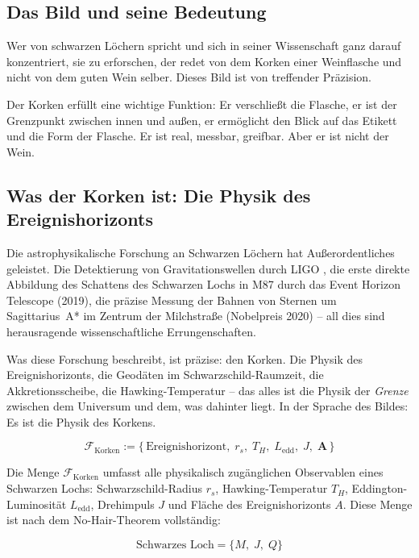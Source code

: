 ﻿\documentclass[12pt,a4paper]{report}
\begin{document}
\subsection{Das Bild und seine Bedeutung}

Wer von schwarzen Löchern spricht und sich in seiner Wissenschaft ganz darauf konzentriert, sie zu erforschen, der redet von dem Korken einer Weinflasche und nicht von dem guten Wein selber. Dieses Bild ist von treffender Präzision.

Der Korken erfüllt eine wichtige Funktion: Er verschließt die Flasche, er ist der Grenzpunkt zwischen innen und außen, er ermöglicht den Blick auf das Etikett und die Form der Flasche. Er ist real, messbar, greifbar. Aber er ist nicht der Wein.

\subsection{Was der Korken ist: Die Physik des Ereignishorizonts}

Die astrophysikalische Forschung an Schwarzen Löchern hat Außerordentliches geleistet. Die Detektierung von Gravitationswellen durch LIGO \cite{abbott2016ligo}, die erste direkte Abbildung des Schattens des Schwarzen Lochs in M87 durch das Event Horizon Telescope (2019), die präzise Messung der Bahnen von Sternen um Sagittarius~A* im Zentrum der Milchstraße (Nobelpreis 2020) -- all dies sind herausragende wissenschaftliche Errungenschaften.

Was diese Forschung beschreibt, ist präzise: den Korken. Die Physik des Ereignishorizonts, die Geodäten im Schwarzschild-Raumzeit, die Akkretionsscheibe, die Hawking-Temperatur -- das alles ist die Physik der \emph{Grenze} zwischen dem Universum und dem, was dahinter liegt. In der Sprache des Bildes: Es ist die Physik des Korkens.

\begin{equation}
	\mathcal{F}_{\text{Korken}} := \bigl\{\,\text{Ereignishorizont},\; r_s,\; T_H,\; L_{\text{edd}},\; J,\; \mathbf{A}\,\bigr\}
	\label{eq:korken_menge}
\end{equation}

Die Menge $\mathcal{F}_{\text{Korken}}$ umfasst alle physikalisch zugänglichen Observablen eines Schwarzen Lochs: Schwarzschild-Radius $r_s$, Hawking-Temperatur $T_H$, Eddington-Luminosität $L_{\text{edd}}$, Drehimpuls $J$ und Fläche des Ereignishorizonts $A$. Diese Menge ist nach dem No-Hair-Theorem vollständig:

\begin{equation}
	\text{Schwarzes Loch} = \bigl\{M,\; J,\; Q\bigr\}
	\label{eq:no_hair}
\end{equation}
\end{document}
